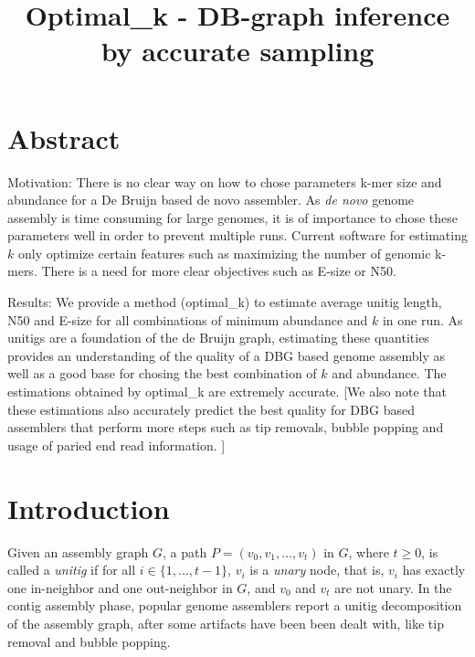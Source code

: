 \documentclass[a4paper,11pt]{article}
\newcommand{\kristoffer}[1]{{\color{red}{#1}}}
\begin{document}
\title{Optimal\_k - DB-graph inference by accurate sampling} 
\author{}
\date{} %
\maketitle

\section{Abstract}
Motivation: There is no clear way on how to chose parameters k-mer size and abundance for a De Bruijn based de novo assembler. As \emph{de novo} genome assembly is time consuming for large genomes, it is of importance to chose these parameters well in order to prevent multiple runs. Current software for estimating $k$ only optimize certain features such as maximizing the number of genomic k-mers. There is a need for more clear objectives such as E-size or N50.

Results:
We provide a method (optimal\_k) to estimate average unitig length, N50 and E-size for all combinations of minimum abundance and $k$ in one run. As unitigs are a foundation of the de Bruijn graph, estimating these quantities provides an understanding of the quality of a DBG based genome assembly as well as a good base for chosing the best combination of $k$ and abundance. The estimations obtained by optimal\_k are extremely accurate. [We also note that these estimations also accurately predict the best quality for DBG based assemblers that perform more steps such as tip removals, bubble popping and usage of paried end read information. ]

\section{Introduction} %
\label{sec:introduction}

\kristoffer{ Mention that there are not many tools for computing optimal parameters at all. And make sure to mention that memry is not the issue. Mention the positives about our methods like speed and clear objective function but make sure to mention that it's memory requiring but thats not a problem if you are going to do the assembly anyway!!}

Given an assembly graph $G$, a path $P = (v_0,v_1,\dots,v_t)$ in $G$, where $t \geq 0$, is called a \emph{unitig} if for all $i \in \{1,\dots,t-1\}$, $v_i$ is a \emph{unary} node, that is, $v_i$ has exactly one in-neighbor and one out-neighbor in $G$, and $v_0$ and $v_{t}$ are not unary. In the contig assembly phase, popular genome assemblers report a unitig decomposition of the assembly graph, after some artifacts have been been dealt with, like tip removal and bubble popping.
\end{document}
